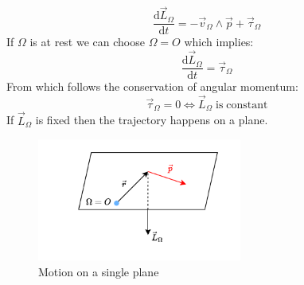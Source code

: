 \begin{itemize}
\begin{equation}
    \end{equation}
    \begin{equation}
        \dfrac{\mathrm{d}\vec{L}_{\Omega}}{\mathrm{d}t} = - \vec{v}_{\Omega}\wedge\vec{p} + \vec{\tau}_{\Omega}
    \end{equation}
    If $\Omega$ is at rest we can choose $\Omega = O$ which implies:
    \begin{equation}
        \dfrac{\mathrm{d}\vec{L}_{\Omega}}{\mathrm{d}t} = \vec{\tau}_{\Omega}
    \end{equation}
    From which follows the conservation of angular momentum:
    \begin{equation}
        \vec{\tau}_{\Omega} = 0 \iff\vec{L}_{\Omega}\;\mathrm{is\;constant}
    \end{equation}
    If $\vec{L}_{\Omega}$ is fixed then the trajectory happens on a plane.
    \begin{figure}[!ht]
        \centering
        \includegraphics[width=0.6\textwidth]{res/svg/singleplanemotion.drawio}
        \caption{Motion on a single plane}
        \label{fig:image3}
    \end{figure}
\end{itemize}
